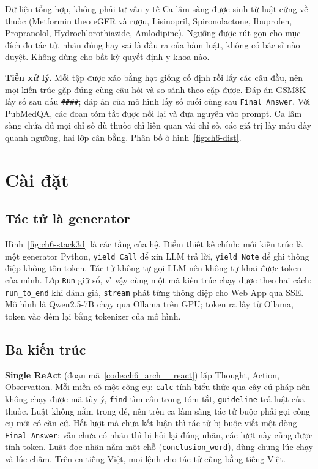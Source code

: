 \begin{luuy}{Dữ liệu tổng hợp, không phải tư vấn y tế}
Ca lâm sàng được sinh từ  luật cứng về thuốc (Metformin theo eGFR và rượu, Lisinopril, Spironolactone, Ibuprofen, Propranolol, Hydrochlorothiazide, Amlodipine). Ngưỡng được rút gọn cho mục đích đo tác tử, nhãn đúng hay sai là đầu ra của hàm luật, không có bác sĩ nào duyệt. Không dùng cho bất kỳ quyết định y khoa nào.
\end{luuy}

\textbf{Tiền xử lý.} Mỗi tập được xáo bằng hạt giống cố định rồi lấy các câu đầu, nên mọi kiến trúc gặp đúng cùng câu hỏi và so sánh theo cặp được. Đáp án GSM8K lấy số sau dấu \texttt{\#\#\#\#}; đáp án của mô hình lấy số cuối cùng sau \texttt{Final Answer}. Với PubMedQA, các đoạn tóm tắt được nối lại và đưa nguyên vào prompt. Ca lâm sàng chứa đủ mọi chỉ số dù thuốc chỉ liên quan vài chỉ số, các giá trị lấy mẫu dày quanh ngưỡng, hai lớp cân bằng. Phân bố ở hình~\ref{fig:ch6-dist}.



\clearpage
\section{Cài đặt}
\subsection{Tác tử là generator}
Hình~\ref{fig:ch6-stack3d} là các tầng của hệ. Điểm thiết kế chính: mỗi kiến trúc là một generator Python, \texttt{yield Call} để xin LLM trả lời, \texttt{yield Note} để ghi thông điệp không tốn token. Tác tử không tự gọi LLM nên không tự khai được token của mình. Lớp \texttt{Run} giữ sổ, vì vậy cùng một mã kiến trúc chạy được theo hai cách: \texttt{run\_to\_end} khi đánh giá, \texttt{stream} phát từng thông điệp cho Web App qua SSE. Mô hình là Qwen2.5-7B chạy qua Ollama trên GPU; token ra lấy từ Ollama, token vào đếm lại bằng tokenizer của mô hình.


\subsection{Ba kiến trúc}
\textbf{Single ReAct} (đoạn mã~\ref{code:ch6_arch__react}) lặp Thought, Action, Observation. Mỗi miền có một công cụ: \texttt{calc} tính biểu thức qua cây cú pháp nên không chạy được mã tùy ý, \texttt{find} tìm câu trong tóm tắt, \texttt{guideline} trả luật của thuốc. Luật không nằm trong đề, nên trên ca lâm sàng tác tử buộc phải gọi công cụ mới có căn cứ. Hết lượt mà chưa kết luận thì tác tử bị buộc viết một dòng \texttt{Final Answer}; vẫn chưa có nhãn thì bị hỏi lại đúng nhãn, các lượt này cũng được tính token. Luật đọc nhãn nằm một chỗ (\texttt{conclusion\_word}), dùng chung lúc chạy và lúc chấm. Trên ca tiếng Việt, mọi lệnh cho tác tử cũng bằng tiếng Việt.

